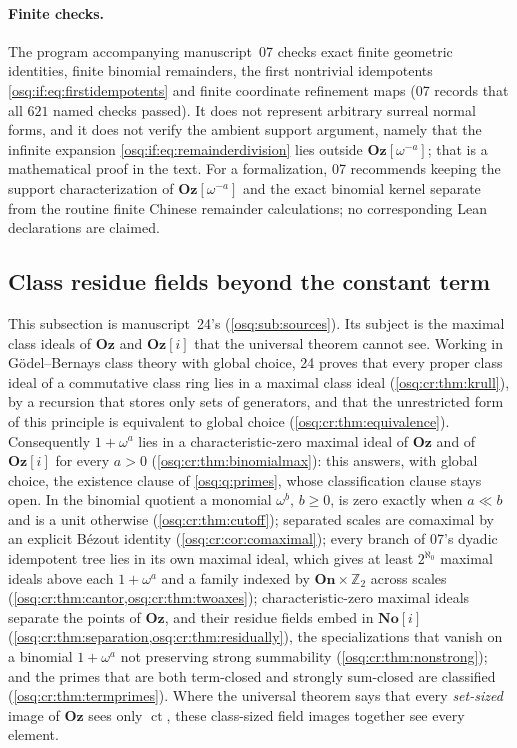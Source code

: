 \documentclass[11pt,letterpaper]{article}
\numberwithin{equation}{section}
\theoremstyle{definition}
\theoremstyle{remark}
\theoremstyle{plain}
\newcommand{\No}{\mathbf{No}}
\newcommand{\On}{\mathbf{On}}
\newcommand{\Oz}{\mathbf{Oz}}
\newcommand{\SC}{\No[i]}
\newcommand{\GOz}{\Oz[i]}
\newcommand{\Z}{\mathbb Z}
\newcommand{\ct}{\operatorname{ct}}
\begin{document}
\paragraph{Finite checks.} The program accompanying manuscript~07 checks exact finite
geometric identities, finite binomial remainders, the first nontrivial idempotents
\eqref{osq:if:eq:firstidempotents} and finite coordinate refinement maps (07 records that
all $621$ named checks passed). It does not represent arbitrary surreal normal forms, and
it does not verify the ambient support argument, namely that the infinite expansion
\eqref{osq:if:eq:remainderdivision} lies outside $\Oz[\omega^{-a}]$; that is a
mathematical proof in the text. For a formalization, 07 recommends keeping the support
characterization of $\Oz[\omega^{-a}]$ and the exact binomial kernel separate from the
routine finite Chinese remainder calculations; no corresponding Lean declarations are
claimed.

\subsection{Class residue fields beyond the constant term}\label{osq:cr:sub:residues}

This subsection is manuscript~24's (\cref{osq:sub:sources}). Its subject is the maximal class ideals of $\Oz$ and $\GOz$ that the universal
theorem cannot see. Working in G\"odel--Bernays class theory with global choice, 24 proves that every proper class ideal of a commutative class
ring lies in a maximal class ideal (\cref{osq:cr:thm:krull}), by a recursion that stores only sets of generators, and that the unrestricted form of
this principle is equivalent to global choice (\cref{osq:cr:thm:equivalence}). Consequently $1+\omega^a$ lies in a characteristic-zero maximal ideal
of $\Oz$ and of $\GOz$ for every $a>0$ (\cref{osq:cr:thm:binomialmax}): this answers, with global choice, the existence clause of
\cref{osq:q:primes}, whose classification clause stays open. In the binomial quotient a monomial $\omega^b$, $b\ge0$, is zero exactly when $a\ll b$
and is a unit otherwise (\cref{osq:cr:thm:cutoff}); separated scales are comaximal by an explicit B\'ezout identity (\cref{osq:cr:cor:comaximal});
every branch of 07's dyadic idempotent tree lies in its own maximal ideal, which gives at least $2^{\aleph_0}$ maximal ideals above each $1+\omega^a$
and a family indexed by $\On\times\Z_2$ across scales (\cref{osq:cr:thm:cantor,osq:cr:thm:twoaxes}); characteristic-zero maximal ideals separate
the points of $\Oz$, and their residue fields embed in $\SC$ (\cref{osq:cr:thm:separation,osq:cr:thm:residually}), the specializations that
vanish on a binomial $1+\omega^a$ not preserving strong summability (\cref{osq:cr:thm:nonstrong}); and the primes that are both term-closed and strongly sum-closed are
classified (\cref{osq:cr:thm:termprimes}). Where the universal theorem says that every \emph{set-sized} image of $\Oz$ sees only $\ct$, these
class-sized field images together see every element.
\end{document}
